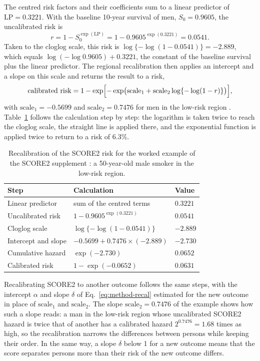 The centred risk factors and their coefficients sum to a linear predictor of $\mathrm{LP} = 0.3221$.
With the baseline 10-year survival of men, $S_0 = 0.9605$, the uncalibrated risk is
\begin{equation*}
  r = 1 - S_0^{\exp(\mathrm{LP})} = 1 - 0.9605^{\exp(0.3221)} = 0.0541 .
\end{equation*}
Taken to the cloglog scale, this risk is $\log\{-\log(1 - 0.0541)\} = -2.889$, which equals $\log(-\log 0.9605) + 0.3221$, the constant of the baseline survival plus the linear predictor.
The regional recalibration then applies an intercept and a slope on this scale and returns the result to a risk,
\begin{equation*}
  \text{calibrated risk} = 1 - \exp\Bigl[-\exp\bigl(\mathrm{scale}_1 + \mathrm{scale}_2 \log\{-\log(1 - r)\}\bigr)\Bigr],
\end{equation*}
with $\mathrm{scale}_1 = -0.5699$ and $\mathrm{scale}_2 = 0.7476$ for men in the low-risk region \cite[Supplementary Methods, Table~3]{score2_2021}.
Table~\ref{tab:app-score2-recal} follows the calculation step by step: the logarithm is taken twice to reach the cloglog scale, the straight line is applied there, and the exponential function is applied twice to return to a risk of 6.3\%.

\begin{table}[htbp]
  \centering
  \caption{Recalibration of the SCORE2 risk for the worked example of the SCORE2 supplement \cite[Supplementary Methods, Table~4]{score2_2021}: a 50-year-old male smoker in the low-risk region.}
  \label{tab:app-score2-recal}
  \begin{tabular}{lll}
    \toprule
    Step & Calculation & Value \\
    \midrule
    Linear predictor & sum of the centred terms & $0.3221$ \\
    Uncalibrated risk & $1 - 0.9605^{\exp(0.3221)}$ & $0.0541$ \\
    Cloglog scale & $\log\{-\log(1 - 0.0541)\}$ & $-2.889$ \\
    Intercept and slope & $-0.5699 + 0.7476 \times (-2.889)$ & $-2.730$ \\
    Cumulative hazard & $\exp(-2.730)$ & $0.0652$ \\
    Calibrated risk & $1 - \exp(-0.0652)$ & $0.0631$ \\
    \bottomrule
  \end{tabular}
\end{table}

Recalibrating SCORE2 to another outcome follows the same steps, with the intercept $\alpha$ and slope $\delta$ of Eq.~\eqref{eq:method-recal} estimated for the new outcome in place of $\mathrm{scale}_1$ and $\mathrm{scale}_2$.
The slope $\mathrm{scale}_2 = 0.7476$ of the example shows how such a slope reads: a man in the low-risk region whose uncalibrated SCORE2 hazard is twice that of another has a calibrated hazard $2^{0.7476} = 1.68$ times as high, so the recalibration narrows the differences between persons while keeping their order.
In the same way, a slope $\delta$ below 1 for a new outcome means that the score separates persons more than their risk of the new outcome differs.
